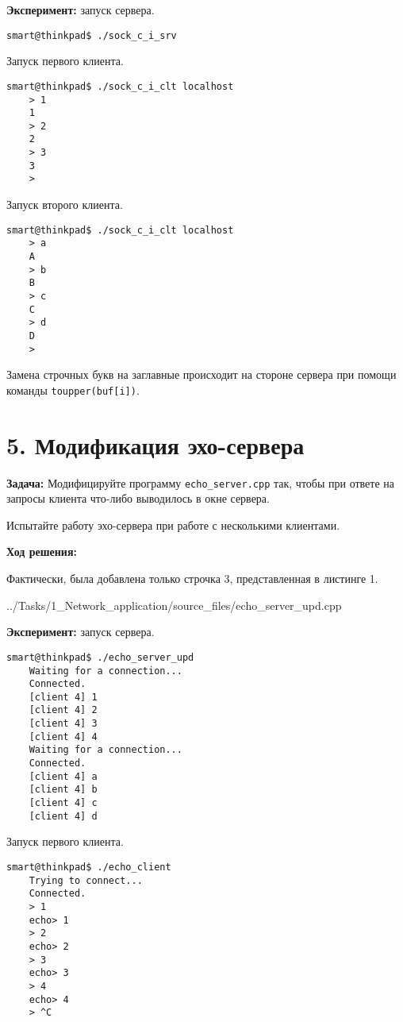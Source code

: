 \textbf{Эксперимент:} запуск сервера.
\begin{Verbatim}[frame=single,breaklines=true,breakanywhere=true]
    smart@thinkpad$ ./sock_c_i_srv 
\end{Verbatim}

Запуск первого клиента.
\begin{Verbatim}[frame=single,breaklines=true,breakanywhere=true]
    smart@thinkpad$ ./sock_c_i_clt localhost
    > 1
    1
    > 2
    2
    > 3
    3
    > 
\end{Verbatim}

Запуск второго клиента.
\begin{Verbatim}[frame=single,breaklines=true,breakanywhere=true]
    smart@thinkpad$ ./sock_c_i_clt localhost
    > a
    A
    > b
    B
    > c
    C
    > d
    D
    > 
\end{Verbatim}

Замена строчных букв на заглавные происходит на стороне сервера при помощи команды \texttt{toupper(buf[i])}.

\section*{5. Модификация эхо-сервера}
\textbf{Задача:} Модифицируйте программу \texttt{echo\_server.cpp} так, чтобы при ответе на запросы клиента что-либо выводилось в окне сервера.

Испытайте работу эхо-сервера при работе с несколькими клиентами.

\textbf{Ход решения:}

Фактически, была добавлена только строчка 3, представленная в листинге 1.


{../Tasks/1_Network_application/source_files/echo_server_upd.cpp}

\textbf{Эксперимент:} запуск сервера.
\begin{Verbatim}[frame=single,breaklines=true,breakanywhere=true]
    smart@thinkpad$ ./echo_server_upd 
    Waiting for a connection...
    Connected.
    [client 4] 1
    [client 4] 2
    [client 4] 3
    [client 4] 4
    Waiting for a connection...
    Connected.
    [client 4] a
    [client 4] b
    [client 4] c
    [client 4] d
\end{Verbatim}

Запуск первого клиента.
\begin{Verbatim}[frame=single,breaklines=true,breakanywhere=true]
    smart@thinkpad$ ./echo_client 
    Trying to connect...
    Connected.
    > 1
    echo> 1
    > 2
    echo> 2
    > 3
    echo> 3
    > 4
    echo> 4
    > ^C
\end{Verbatim}

